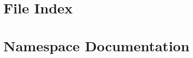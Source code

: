 \let\mypdfximage\pdfximage\def\pdfximage{\immediate\mypdfximage}\documentclass[twoside]{book}
\newcommand{\+}{\discretionary{\mbox{\scriptsize$\hookleftarrow$}}{}{}}
\begin{document}
\chapter{File Index}

\chapter{Namespace Documentation}



























\end{document}
